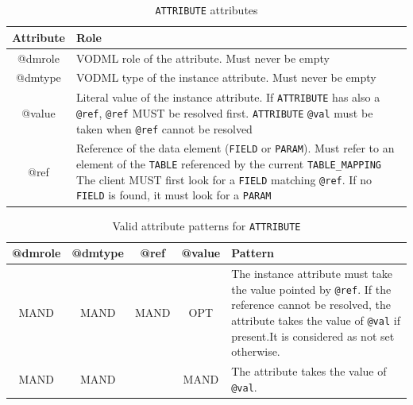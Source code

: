 \documentclass[11pt,a4paper]{ivoa}
\begin{document}
\begin{table}[!htbp]
\small
\centering
\begin{tabulary}{\linewidth}{|c|J|}
       \hline 
          \textbf{Attribute} & 
          \textbf{Role}\\
       \hline         \hline  
          @dmrole    & 
           VODML role of the attribute. 
           \newline  Must never be empty\\       
       \hline 
          @dmtype    & 
          VODML type of the instance attribute.
           \newline  Must never be empty\\
       \hline  
          @value   &
          Literal value of the instance attribute. 
                     \newline If  \texttt{ATTRIBUTE} has also a \texttt{@ref}, \texttt{@ref} MUST be resolved first.
                     \texttt{ATTRIBUTE}  \texttt{@val} must be taken when \texttt{@ref} cannot be resolved \\
        \hline
           @ref & 
            Reference of the data element (\texttt{FIELD} or \texttt{PARAM}).  
                    \newline Must refer to an element of the \texttt{TABLE}  referenced by the current     
                    \texttt{TABLE\_MAPPING}                    
                    \newline The client MUST first look for a \texttt{FIELD} matching \texttt{@ref}. 
                    \newline If no \texttt{FIELD}  is found, it must look for a \texttt{PARAM}
                    \\
       \hline 
     \end{tabulary}
     \caption{\texttt{ATTRIBUTE} attributes} 
     \label{tbl:att-att}
 \end{table}

\begin{table}[!t]
\small
\centering
\begin{tabulary}{1.0\linewidth}{|c|c|c|c|J|}

    \hline    
          \textbf{@dmrole}  &  
          \textbf{@dmtype} &  
          \textbf{@ref} &  
          \textbf{@value} &  
          \textbf{Pattern}\\
    \hline   \hline 
          MAND & 
          MAND &  
          MAND &  
          OPT & 
          The instance attribute must take the value pointed by \texttt{@ref}. 
           \newline If the reference cannot be resolved, the attribute takes the value of \texttt{@val} if present.\newline  It is considered as not set otherwise.   \\
     \hline  
          MAND & 
          MAND &   
          &  
          MAND & 
          The attribute takes the value of \texttt{@val}.   \\
     \hline 
  \end{tabulary}
  \caption{Valid attribute patterns for  \texttt{ATTRIBUTE}} 
  \label{tbl:att-pattern}
 \end{table}
\FloatBarrier
\end{document}
